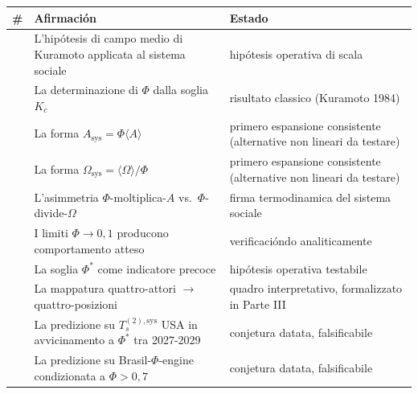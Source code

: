 {\def\LTcaptype{none} %
{\small\begin{longtable}[]{@{}
  >{\raggedright\arraybackslash}p{}
  >{\raggedright\arraybackslash}p{}
  >{\raggedright\arraybackslash}p{}@{}}
\toprule\noalign{}
\begin{minipage}[b]{\linewidth}\raggedright
\#
\end{minipage} & \begin{minipage}[b]{\linewidth}\raggedright
Afirmación
\end{minipage} & \begin{minipage}[b]{\linewidth}\raggedright
Estado
\end{minipage} \\
\midrule\noalign{}
\endhead
\bottomrule\noalign{}
\endlastfoot
1 & L'hipótesis di campo medio di Kuramoto applicata al sistema sociale &
\Hypoth{} hipótesis operativa di scala \\
2 & La determinazione di \(\Phi\) dalla soglia \(K_c\) & \Proved{}
risultato classico (Kuramoto 1984) \\
3 & La forma \(A_{\text{sys}} = \Phi \langle A\rangle\) & \Hypoth{}
primero espansione consistente (alternative non lineari da testare) \\
4 & La forma \(\Omega_{\text{sys}} = \langle\Omega\rangle/\Phi\) &
\Hypoth{} primero espansione consistente (alternative non lineari da
testare) \\
5 & L'asimmetria \(\Phi\)-moltiplica-\(A\)
vs.~\(\Phi\)-divide-\(\Omega\) & \Hypoth{} firma termodinamica del
sistema sociale \\
6 & I limiti \(\Phi \to 0, 1\) producono comportamento atteso &
\Proved{} verificacióndo analiticamente \\
7 & La soglia \(\Phi^*\) come indicatore precoce & \Hypoth{} hipótesis
operativa testabile \\
8 & La mappatura quattro-attori $\to$ quattro-posizioni & \Hypoth{} quadro
interpretativo, formalizzato in Parte III \\
9 & La predizione su \(T_s^{(2),\text{sys}}\) USA in avvicinamento a
\(\Phi^*\) tra 2027-2029 & \Conj{} conjetura datata, falsificabile \\
10 & La predizione su Brasil-$\Phi$-engine condizionata a \(\Phi > 0{,}7\) &
\Conj{} conjetura datata, falsificabile \\
\end{longtable}}
}


